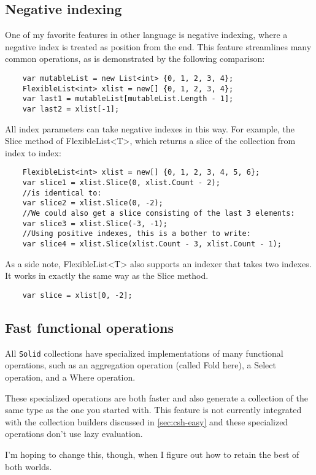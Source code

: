 \documentclass[]{article}
\newcommand{\solid}{\texttt{Solid}\xspace}
\begin{document}
\subsection{Negative indexing}\label{sec:neg-indexing}
One of my favorite features in other language is negative indexing, where a negative index is treated as position from the end. This feature streamlines many common operations, as is demonstrated by the following comparison:
\begin{lstlisting}
	var mutableList = new List<int> {0, 1, 2, 3, 4};
	FlexibleList<int> xlist = new[] {0, 1, 2, 3, 4};
	var last1 = mutableList[mutableList.Length - 1];
	var last2 = xlist[-1];
\end{lstlisting}
All index parameters can take negative indexes in this way. For example, the Slice method of FlexibleList<T>, which returns a slice of the collection from index to index:
\begin{lstlisting}
	FlexibleList<int> xlist = new[] {0, 1, 2, 3, 4, 5, 6};
	var slice1 = xlist.Slice(0, xlist.Count - 2);
	//is identical to:
	var slice2 = xlist.Slice(0, -2);
	//We could also get a slice consisting of the last 3 elements:
	var slice3 = xlist.Slice(-3, -1);
	//Using positive indexes, this is a bother to write:
	var slice4 = xlist.Slice(xlist.Count - 3, xlist.Count - 1);
\end{lstlisting}
As a side note, FlexibleList<T> also supports an indexer that takes two indexes. It works in exactly the same way as the Slice method.
\begin{lstlisting}
	var slice = xlist[0, -2];
\end{lstlisting}

\subsection{Fast functional operations}\label{sec:lib-functional}
All \solid collections have specialized implementations of many functional operations, such as an aggregation operation (called Fold here), a Select operation, and a Where operation.

These specialized operations are both faster and also generate a collection of the same type as the one you started with. This feature is not currently integrated with the collection builders discussed in \cref{sec:csh-easy} and these specialized operations don't use lazy evaluation. 

I'm hoping to change this, though, when I figure out how to retain the best of both worlds.
\end{document}
